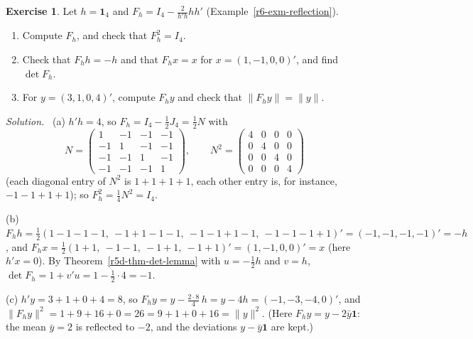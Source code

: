 \documentclass[12pt]{article}
\newcommand{\one}{\mathbf 1}
\theoremstyle{definition}
\newtheorem{exercise}{Exercise}
\newenvironment{solution}{\par\noindent\textit{Solution.}\ }{\par\smallskip}
\begin{document}
\begin{exercise}\label{r6-dr-reflection}
Let \(h=\one_4\) and \(F_h=I_4-\frac2{h'h}hh'\) (Example~\ref{r6-exm-reflection}).
\begin{enumerate}
\item Compute \(F_h\), and check that \(F_h^2=I_4\).
\item Check that \(F_hh=-h\) and that \(F_hx=x\) for \(x=(1,-1,0,0)'\), and find \(\det F_h\).
\item For \(y=(3,1,0,4)'\), compute \(F_hy\) and check that \(\lVert F_hy\rVert=\lVert y\rVert\).
\end{enumerate}
\end{exercise}
\begin{solution}
(a) \(h'h=4\), so \(F_h=I_4-\frac12J_4=\frac12N\) with
\[
N=\begin{pmatrix}1&-1&-1&-1\\-1&1&-1&-1\\-1&-1&1&-1\\-1&-1&-1&1\end{pmatrix},\qquad
N^2=\begin{pmatrix}4&0&0&0\\0&4&0&0\\0&0&4&0\\0&0&0&4\end{pmatrix}
\]
(each diagonal entry of \(N^2\) is \(1+1+1+1\), each other entry is, for instance, \(-1-1+1+1\)); so
\(F_h^2=\frac14N^2=I_4\).

(b) \(F_hh=\frac12(1-1-1-1,\ -1+1-1-1,\ -1-1+1-1,\ -1-1-1+1)'=(-1,-1,-1,-1)'=-h\), and
\(F_hx=\frac12(1+1,\ -1-1,\ -1+1,\ -1+1)'=(1,-1,0,0)'=x\) (here \(h'x=0\)). By Theorem~\ref{r5d-thm-det-lemma}
with \(u=-\frac12h\) and \(v=h\), \(\det F_h=1+v'u=1-\frac12\cdot4=-1\).

(c) \(h'y=3+1+0+4=8\), so \(F_hy=y-\frac{2\cdot8}4\,h=y-4h=(-1,-3,-4,0)'\), and
\(\lVert F_hy\rVert^2=1+9+16+0=26=9+1+0+16=\lVert y\rVert^2\). (Here \(F_hy=y-2\bar y\one\): the mean \(\bar y=2\) is
reflected to \(-2\), and the deviations \(y-\bar y\one\) are kept.)
\end{solution}
\end{document}
